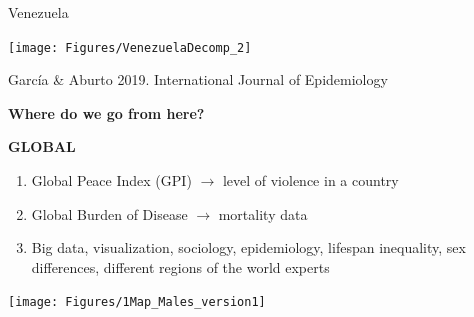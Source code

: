 \documentclass[xcolor={dvipsnames}]{beamer}
\begin{document}
\begin{frame}
	\begin{center}
		\Large{Venezuela}
	\end{center}

	\hspace*{-1cm}   
	\texttt{[image: Figures/VenezuelaDecomp\_2]}	
	
\tiny{Garc\'ia \& Aburto 2019. International Journal of Epidemiology}

\end{frame}
%
%
%
%	




\begin{frame}
\Huge{
\begin{center}
\textbf{Where do we go from here?} \pause

\bigskip

\textbf{GLOBAL}
\end{center}
}
\end{frame}

\begin{frame}
	\LARGE{ 
		
		\begin{enumerate}
		
		\item Global Peace Index (GPI) $\longrightarrow$ level of violence in a country \pause

		\item Global Burden of Disease $\longrightarrow$ mortality data \pause
		
		\item Big data, visualization, sociology, epidemiology, lifespan inequality, sex differences, different regions of the world experts
						
		\end{enumerate}
		
		}
\end{frame}



\begin{frame}

\hspace*{-1cm}   
	\texttt{[image: Figures/1Map\_Males\_version1]}	

\bigskip
	

\end{frame}
\end{document}
